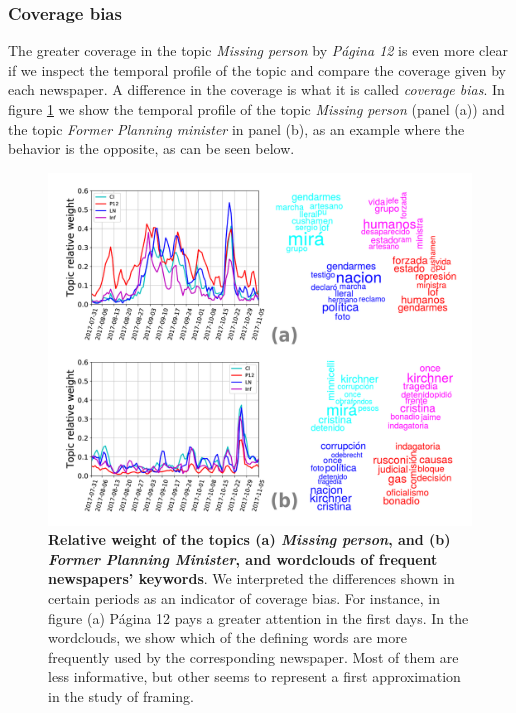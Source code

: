\subsubsection{Coverage bias}

\par The greater coverage in the topic \emph{Missing person} by \emph{Página 12} is even more clear if we inspect the temporal profile of the topic and compare the coverage given by each newspaper. A difference in the coverage is what it is called \emph{coverage bias}.
In figure \ref{fig:topics_temporal_profiles} we show the temporal profile of the topic \emph{Missing person} (panel (a)) and the topic \emph{Former Planning minister} in panel (b), as an example where the behavior is the opposite, as can be seen below.

\begin{figure}[h]
\centering
\includegraphics[width = \textwidth]{images/Fig7.pdf}
\caption{\textbf{Relative weight of the topics (a) \emph{Missing person}, and (b) \emph{Former Planning Minister}, and wordclouds of frequent newspapers' keywords}. We interpreted the differences shown in certain periods as an indicator of coverage bias. For instance, in figure (a) Página 12 pays a greater attention in the first days. In the wordclouds, we show which of the defining words are more frequently used by the corresponding newspaper. Most of them are less informative, but other seems to represent a first approximation in the study of framing.}
\label{fig:topics_temporal_profiles}
\end{figure}



